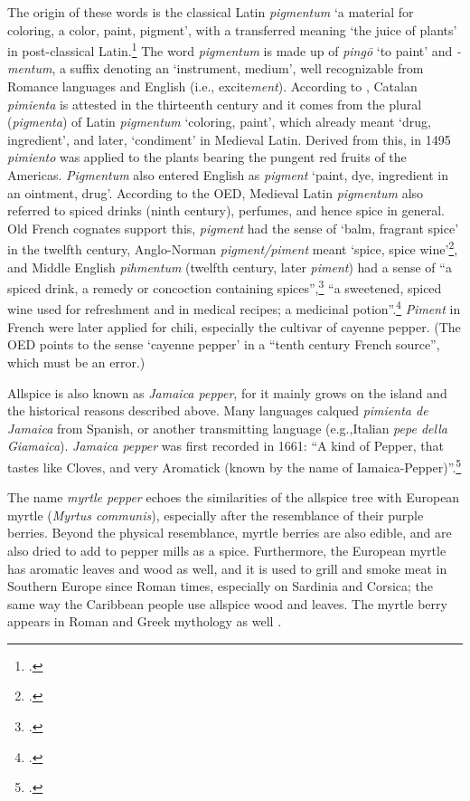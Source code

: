 The origin of these words is the classical Latin \textit{pigmentum} `a material for coloring, a color, paint, pigment', with a transferred meaning `the juice of plants' in post-classical Latin.\footcite[pigmentum ]{lewis_latin_1879} The word \textit{pigmentum} is made up of \textit{pingō} `to paint' and \textit{-mentum}, a suffix denoting an `instrument, medium', well recognizable from Romance languages and English (i.e., excite\textit{ment}).
According to \textcite[459]{corominas_breve_1987}, Catalan \textit{pimienta} is attested in the thirteenth century and it comes from the plural (\textit{pigmenta}) of Latin \textit{pigmentum} `coloring, paint', which already meant `drug, ingredient', and later, `condiment' in Medieval Latin. Derived from this, in 1495 \textit{pimiento} was applied to the plants bearing the pungent red fruits of the Americas. \textit{Pigmentum} also entered English as \textit{pigment} `paint, dye, ingredient in an ointment, drug'. According to the \gls{OED}, Medieval Latin \textit{pigmentum} also referred to spiced drinks (ninth century), perfumes, and hence spice in general. Old French cognates support this, \textit{pigment} had the sense of `balm, fragrant spice' in the twelfth century, Anglo-Norman \textit{pigment/piment} meant `spice, spice wine'\footcite[pigment]{oed}, and Middle English \textit{pihmentum} (twelfth century, later \textit{piment}) had a sense of ``a spiced drink, a remedy or concoction containing spices'',\footcite[pigment]{oe} ``a sweetened, spiced wine used for refreshment and in medical recipes; a medicinal potion''.\footcite[piment]{med} \textit{Piment} in French were later applied for chili, especially the cultivar of cayenne pepper. (The \gls{OED} points to the sense `cayenne pepper' in a ``tenth century French source'', which must be an error.)


Allspice is also known as \textit{Jamaica pepper}, for it mainly grows on the island and the historical reasons described above. Many languages calqued \textit{pimienta de Jamaica} from Spanish, or another transmitting language (e.g.,Italian \textit{pepe della Giamaica}). \textit{Jamaica pepper} was first recorded in 1661: ``A kind of Pepper, that tastes like Cloves, and very Aromatick (known by the name of Iamaica-Pepper)''.\footcite[Jamaica]{oed}

The name \textit{myrtle pepper}  echoes the similarities of the allspice tree with European myrtle (\textit{Myrtus communis}), especially after the resemblance of their purple berries. Beyond the physical resemblance, myrtle berries are also edible, and are also dried to add to pepper mills as a spice. Furthermore, the European myrtle has aromatic leaves and wood as well, and it is used to grill and smoke meat in Southern Europe since Roman times, especially on Sardinia and Corsica; the same way the Caribbean people use allspice wood and leaves. The myrtle berry appears in Roman and Greek mythology as well \autocite[186]{van_wyk_culinary_2014}.

